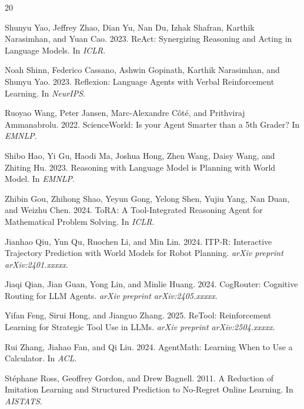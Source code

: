 \documentclass[11pt,a4paper]{article}
\begin{document}
\begin{thebibliography}{20}

Shunyu Yao, Jeffrey Zhao, Dian Yu, Nan Du, Izhak Shafran, Karthik Narasimhan, and Yuan Cao. 2023.
\newblock ReAct: Synergizing Reasoning and Acting in Language Models.
\newblock In \emph{ICLR}.

Noah Shinn, Federico Cassano, Ashwin Gopinath, Karthik Narasimhan, and Shunyu Yao. 2023.
\newblock Reflexion: Language Agents with Verbal Reinforcement Learning.
\newblock In \emph{NeurIPS}.

Ruoyao Wang, Peter Jansen, Marc-Alexandre C\^{o}t\'{e}, and Prithviraj Ammanabrolu. 2022.
\newblock ScienceWorld: Is your Agent Smarter than a 5th Grader?
\newblock In \emph{EMNLP}.

Shibo Hao, Yi Gu, Haodi Ma, Joshua Hong, Zhen Wang, Daisy Wang, and Zhiting Hu. 2023.
\newblock Reasoning with Language Model is Planning with World Model.
\newblock In \emph{EMNLP}.

Zhibin Gou, Zhihong Shao, Yeyun Gong, Yelong Shen, Yujiu Yang, Nan Duan, and Weizhu Chen. 2024.
\newblock ToRA: A Tool-Integrated Reasoning Agent for Mathematical Problem Solving.
\newblock In \emph{ICLR}.

Jianhao Qiu, Yun Qu, Ruochen Li, and Min Lin. 2024.
\newblock ITP-R: Interactive Trajectory Prediction with World Models for Robot Planning.
\newblock \emph{arXiv preprint arXiv:2401.xxxxx}.

Jiaqi Qian, Jian Guan, Yong Lin, and Minlie Huang. 2024.
\newblock CogRouter: Cognitive Routing for LLM Agents.
\newblock \emph{arXiv preprint arXiv:2405.xxxxx}.

Yifan Feng, Sirui Hong, and Jianguo Zhang. 2025.
\newblock ReTool: Reinforcement Learning for Strategic Tool Use in LLMs.
\newblock \emph{arXiv preprint arXiv:2504.xxxxx}.

Rui Zhang, Jiahao Fan, and Qi Liu. 2024.
\newblock AgentMath: Learning When to Use a Calculator.
\newblock In \emph{ACL}.

St\'{e}phane Ross, Geoffrey Gordon, and Drew Bagnell. 2011.
\newblock A Reduction of Imitation Learning and Structured Prediction to No-Regret Online Learning.
\newblock In \emph{AISTATS}.

\end{thebibliography}
\end{document}
